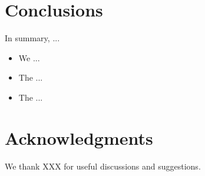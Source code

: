 \documentclass[useAMS,usenatbib]{mn2e}
\begin{document}
\section{Conclusions}
\label{sec:conclusions}

In summary, ...

\begin{itemize}

\item We ...

\item The ...

\item The ...

\end{itemize}




\section*{Acknowledgments}
 
We thank XXX for useful discussions and suggestions.



% 
% 
% 
% 





%


\label{lastpage}
\bsp
\end{document}
